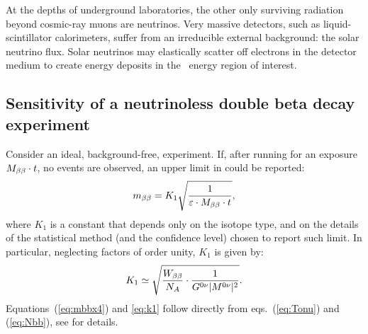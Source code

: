 At the depths of underground laboratories, the other only surviving radiation beyond cosmic-ray muons are neutrinos. Very massive detectors, such as liquid-scintillator calorimeters, suffer from an irreducible external background: the solar neutrino flux. Solar neutrinos may elastically scatter off electrons in the detector medium to create energy deposits in the \bbonu\ energy region of interest.


\subsection{Sensitivity of a neutrinoless double beta decay experiment} \label{subsec:sensitivitydefinition}


Consider an ideal, background-free, experiment. If, after running for an exposure $M_{\beta\beta}\cdot t$, no events are observed, an upper limit in \mbb could be reported:
%
\begin{equation}
m_{\beta\beta} = K_{1} \sqrt{\frac{1}{\varepsilon\cdot M_{\beta\beta} \cdot t}}, \label{eq:mbbx4}
\end{equation}
%
where $K_{1}$ is a constant that depends only on the isotope type, and on the details of the statistical method (and the confidence level) chosen to report such limit. In particular, neglecting factors of order unity, $K_{1}$ is given by:
%
\begin{equation}
K_{1} \simeq \sqrt{\frac{W_{\beta\beta}}{N_A}\cdot \frac{1}{G^{0\nu}\lvert M^{0\nu}\rvert^2}}. \label{eq:k1}
\end{equation}
%
Equations~(\ref{eq:mbbx4}) and \ref{eq:k1} follow directly from eqs.~(\ref{eq:Tonu}) and (\ref{eq:Nbb}), see \cite{Gomez-Cadenas:2010zcc} for details.

